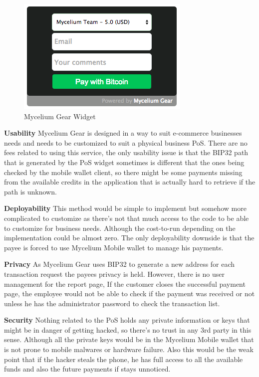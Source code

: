 \begin{figure}[htb!p]
\centering
\includegraphics[scale=0.5]{fig/Mycelium_gear.png}
  \caption{Mycelium Gear Widget}
\label{fig:mycelium-widget}
\end{figure}


\textbf{Usability}
Mycelium Gear is designed in a way to suit e-commerce businesses needs and needs to be customized to suit a physical business PoS. There are no fees related to using this service, the only usability issue is that the BIP32 path that is generated by the PoS widget sometimes is different that the ones being checked by the mobile wallet client, so there might be some payments missing from the available credits in the application that is actually hard to retrieve if the path is unknown.

\textbf{Deployability}
This method would be simple to implement but somehow more complicated to customize as there's not that much access to the code to be able to customize for business needs. Although the cost-to-run depending on the implementation could be almost zero. The only deployability downside is that the payee is forced to use Mycelium Mobile wallet to manage his payments.

 \textbf{Privacy}
As Mycelium Gear uses BIP32 to generate a new address for each transaction request the payees privacy is held. However, there is no user management for the report page, If the customer closes the successful payment page, the employee would not be able to check if the payment was received or not unless he has the administrator password to check the transaction list.

 \textbf{Security}
Nothing related to the PoS holds any private information or keys that might be in danger of getting hacked, so there's no trust in any 3rd party in this sense. Although all the private keys would be in the Mycelium Mobile wallet that is not prone to mobile malwares or hardware failure. Also this would be the weak point that if the hacker steals the phone, he has full access to all the available funds and also the future payments if stays unnoticed.

